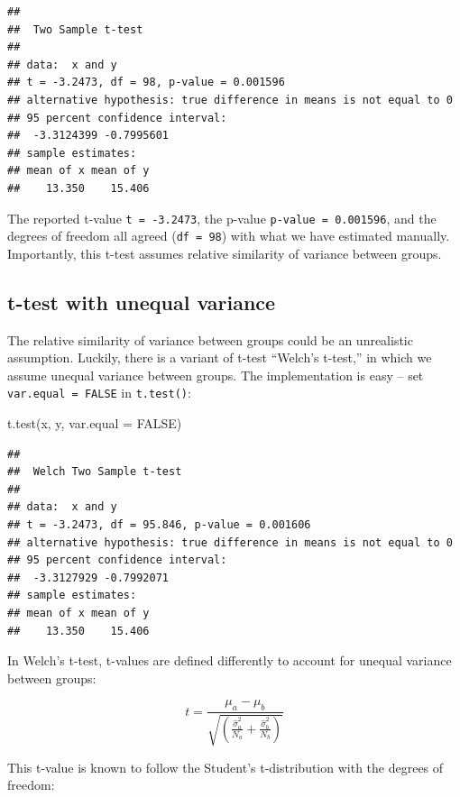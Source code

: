 \documentclass[
]{book}
\newenvironment{Shaded}{\begin{snugshade}}{\end{snugshade}}
\newcommand{\AttributeTok}[1]{\textcolor[rgb]{0.77,0.63,0.00}{#1}}
\newcommand{\ConstantTok}[1]{\textcolor[rgb]{0.00,0.00,0.00}{#1}}
\newcommand{\FunctionTok}[1]{\textcolor[rgb]{0.00,0.00,0.00}{#1}}
\newcommand{\NormalTok}[1]{#1}
\begin{document}
\begin{verbatim}
## 
##  Two Sample t-test
## 
## data:  x and y
## t = -3.2473, df = 98, p-value = 0.001596
## alternative hypothesis: true difference in means is not equal to 0
## 95 percent confidence interval:
##  -3.3124399 -0.7995601
## sample estimates:
## mean of x mean of y 
##    13.350    15.406
\end{verbatim}

The reported t-value \texttt{t\ =\ -3.2473}, the p-value \texttt{p-value\ =\ 0.001596}, and the degrees of freedom all agreed (\texttt{df\ =\ 98}) with what we have estimated manually. Importantly, this t-test assumes relative similarity of variance between groups.

\hypertarget{t-test-with-unequal-variance}{%
\subsection{t-test with unequal variance}\label{t-test-with-unequal-variance}}

The relative similarity of variance between groups could be an unrealistic assumption. Luckily, there is a variant of t-test ``Welch's t-test,'' in which we assume unequal variance between groups. The implementation is easy -- set \texttt{var.equal\ =\ FALSE} in \texttt{t.test()}:

\begin{Shaded}
\begin{Highlighting}[]
\FunctionTok{t.test}\NormalTok{(x, y, }\AttributeTok{var.equal =} \ConstantTok{FALSE}\NormalTok{)}
\end{Highlighting}
\end{Shaded}

\begin{verbatim}
## 
##  Welch Two Sample t-test
## 
## data:  x and y
## t = -3.2473, df = 95.846, p-value = 0.001606
## alternative hypothesis: true difference in means is not equal to 0
## 95 percent confidence interval:
##  -3.3127929 -0.7992071
## sample estimates:
## mean of x mean of y 
##    13.350    15.406
\end{verbatim}

In Welch's t-test, t-values are defined differently to account for unequal variance between groups:

\[
t = \frac{\mu_a - \mu_b}{\sqrt{\left(\frac{\hat{\sigma}^2_a}{N_a} + \frac{\hat{\sigma}^2_b}{N_b}\right)}}
\]

This t-value is known to follow the Student's t-distribution with the degrees of freedom:
\end{document}
